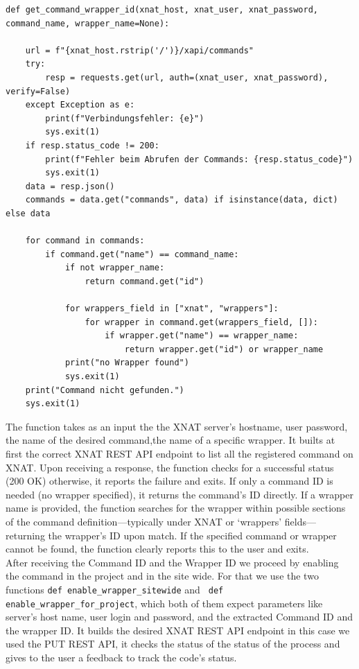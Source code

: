 \begin{lstlisting}
def get_command_wrapper_id(xnat_host, xnat_user, xnat_password, command_name, wrapper_name=None):
 
    url = f"{xnat_host.rstrip('/')}/xapi/commands"
    try:
        resp = requests.get(url, auth=(xnat_user, xnat_password), verify=False)
    except Exception as e:
        print(f"Verbindungsfehler: {e}")
        sys.exit(1)
    if resp.status_code != 200:
        print(f"Fehler beim Abrufen der Commands: {resp.status_code}")
        sys.exit(1)
    data = resp.json()
    commands = data.get("commands", data) if isinstance(data, dict) else data

    for command in commands:
        if command.get("name") == command_name:
            if not wrapper_name:
                return command.get("id")
            
            for wrappers_field in ["xnat", "wrappers"]:
                for wrapper in command.get(wrappers_field, []):
                    if wrapper.get("name") == wrapper_name:
                        return wrapper.get("id") or wrapper_name
            print("no Wrapper found")
            sys.exit(1)
    print("Command nicht gefunden.")
    sys.exit(1)
\end{lstlisting}
The function takes as an input the the XNAT server’s hostname, user password, the name of the desired command,the name of a specific wrapper. It builts at first the correct XNAT REST API endpoint to list all the registered command on XNAT.
Upon receiving a response, the function checks for a successful status (200 OK) otherwise, it reports the failure and exits. If only a command ID is needed (no wrapper specified), it returns the command’s ID directly. If a wrapper name is provided, the function searches for the wrapper within possible sections of the command definition—typically under XNAT or ‘wrappers’ fields—returning the wrapper’s ID upon match. If the specified command or wrapper cannot be found, the function clearly reports this to the user and exits.\\
After receiving the Command ID and the Wrapper ID we proceed by enabling the command in the project and in the site wide. For that we use the two functions \texttt{def enable\_wrapper\_sitewide} and \texttt{ def enable\_wrapper\_for\_project}, which both of them expect parameters like server’s host name, user login and  password, and the extracted Command ID and the wrapper ID. It builds the desired XNAT REST API endpoint in this case we used the PUT REST API, it checks the status of the status of the process and gives to the user a feedback to track the code's status.

